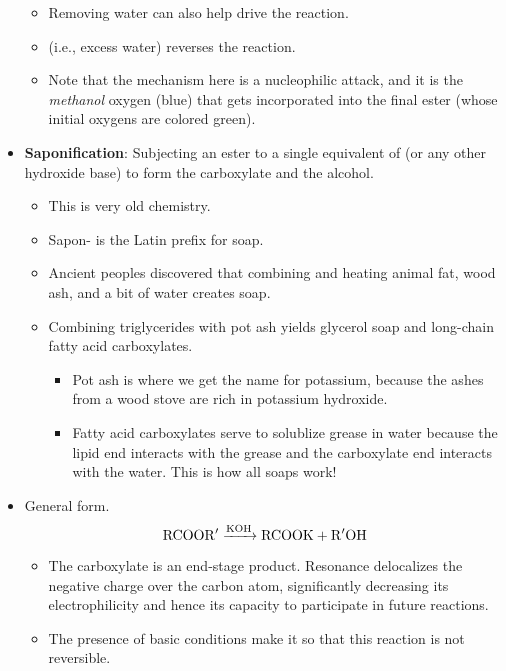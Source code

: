\documentclass[../notes.tex]{subfiles}
\begin{document}
\begin{itemize}
\begin{itemize}
        \item Removing water can also help drive the reaction.
        \item {} (i.e., excess water) reverses the reaction.
        \item Note that the mechanism here is a nucleophilic attack, and it is the \emph{methanol} oxygen (blue) that gets incorporated into the final ester (whose initial oxygens are colored green).
    \end{itemize}
    \item \textbf{Saponification}: Subjecting an ester to a single equivalent of  (or any other hydroxide base) to form the carboxylate and the alcohol.
    \begin{itemize}
        \item This is very old chemistry.
        \item Sapon- is the Latin prefix for soap.
        \item Ancient peoples discovered that combining and heating animal fat, wood ash, and a bit of water creates soap.
        \item Combining triglycerides with pot ash yields glycerol soap and long-chain fatty acid carboxylates.
        \begin{itemize}
            \item Pot ash is where we get the name for potassium, because the ashes from a wood stove are rich in potassium hydroxide.
            \item Fatty acid carboxylates serve to solublize grease in water because the lipid end interacts with the grease and the carboxylate end interacts with the water. This is how all soaps work!
        \end{itemize}
    \end{itemize}
    \item General form.
    \begin{equation*}
        \ce{RCOOR$'$ ->[KOH] RCOOK + R$'$OH}
    \end{equation*}
    \begin{itemize}
        \item The carboxylate is an end-stage product. Resonance delocalizes the negative charge over the carbon atom, significantly decreasing its electrophilicity and hence its capacity to participate in future reactions.
        \item The presence of basic conditions make it so that this reaction is not reversible.
        \begin{itemize}

\end{itemize}
\end{itemize}
\end{itemize}
\end{document}
